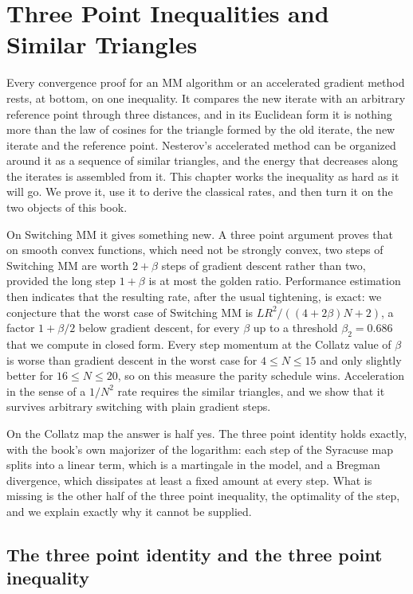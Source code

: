 \chapter{Three Point Inequalities and Similar Triangles}\label{chap:threepoint}

Every convergence proof for an MM algorithm or an accelerated gradient method
rests, at bottom, on one inequality. It compares the new iterate with an
arbitrary reference point through three distances, and in its Euclidean form
it is nothing more than the law of cosines for the triangle formed by the old
iterate, the new iterate and the reference point. Nesterov's accelerated
method can be organized around it as a sequence of similar triangles, and the
energy that decreases along the iterates is assembled from it. This chapter
works the inequality as hard as it will go. We prove it, use it to derive the
classical rates, and then turn it on the two objects of this book.

On Switching MM it gives something new. A three point argument proves that
on smooth convex functions, which need not be strongly convex, two steps of
Switching MM are worth $2+\beta$ steps of gradient descent rather than two,
provided the long step $1+\beta$ is at most the golden ratio. Performance
estimation then indicates that the resulting rate, after the usual tightening,
is exact: we conjecture that the worst case of Switching MM is $LR^2/((4+2\beta)N+2)$, a factor
$1+\beta/2$ below gradient descent, for every $\beta$ up to a threshold
$\beta_2=0.686$ that we compute in closed form. Every step momentum at the Collatz value of
$\beta$ is worse than gradient descent in the worst case for $4\le N\le15$ and only slightly better for $16\le N\le20$, so on this
measure the parity schedule wins. Acceleration in the sense of a $1/N^2$
rate requires the similar triangles, and we show that it survives arbitrary
switching with plain gradient steps.

On the Collatz map the answer is half yes. The three point identity holds
exactly, with the book's own majorizer of the logarithm: each step of the
Syracuse map splits into a linear term, which is a martingale in the model,
and a Bregman divergence, which dissipates at least a fixed amount at every
step. What is missing is the other half of the three point inequality, the
optimality of the step, and we explain exactly why it cannot be supplied.

\section{The three point identity and the three point inequality}\label{sec:ch7b:threepoint}

